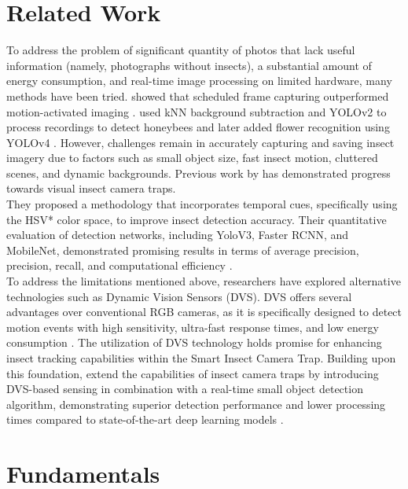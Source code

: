 \documentclass[sigchi,screen]{acmart}
\begin{document}
\section{Related Work}\label{ch02:manual}
To address the problem of significant quantity of photos that lack useful information (namely, photographs without insects), a substantial amount of energy consumption, and real-time image processing on limited hardware, many methods have been tried.
\citeauthor{naqvi2022camera} showed that scheduled frame capturing outperformed motion-activated imaging \citep{naqvi2022camera}.
\citeauthor{ratnayake2021towards} used kNN background subtraction and YOLOv2 to process recordings to detect honeybees \citep{ratnayake2021tracking} and later added flower recognition using YOLOv4 \citep{ratnayake2021towards}.
However, challenges remain in accurately capturing and saving insect imagery due to factors such as small object size, fast insect motion, cluttered scenes, and dynamic backgrounds.
Previous work by \citeauthor{thiele2021towards} has demonstrated progress towards visual insect camera traps.\\
They proposed a methodology that incorporates temporal cues, specifically using the HSV* color space, to improve insect detection accuracy. Their quantitative evaluation of detection networks, including YoloV3, Faster RCNN, and MobileNet, demonstrated promising results in terms of average precision, precision, recall, and computational efficiency \citep{thiele2021towards}.\\
To address the limitations mentioned above, researchers have explored alternative technologies such as Dynamic Vision Sensors (DVS). DVS offers several advantages over conventional RGB cameras, as it is specifically designed to detect motion events with high sensitivity, ultra-fast response times, and low energy consumption \citep{delbruck2016neuromorophic}. The utilization of DVS technology holds promise for enhancing insect tracking capabilities within the Smart Insect Camera Trap. 
Building upon this foundation, \citeauthor{Gebauer_2024_WACV} extend the capabilities of insect camera traps by introducing DVS-based sensing in combination with a real-time small object detection algorithm, demonstrating superior detection performance and lower processing times compared to state-of-the-art deep learning models \citep{Gebauer_2024_WACV}.

\section{Fundamentals}
\end{document}
